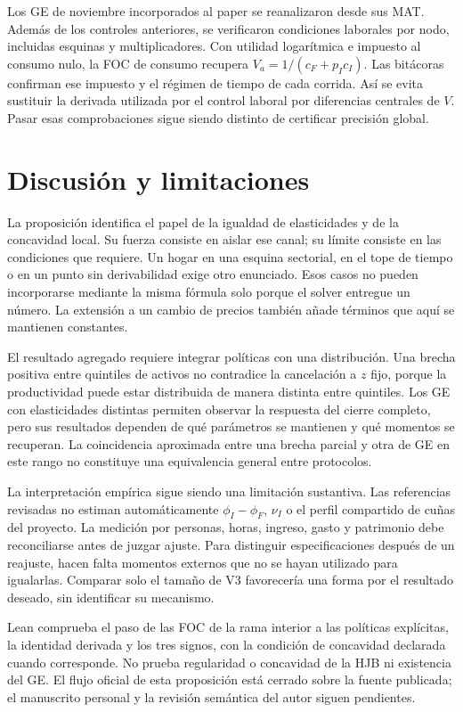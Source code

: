\documentclass[11pt]{article}
\theoremstyle{definition}
\newcommand{\Va}{V_a}
\begin{document}
Los \GEPaperCount{} GE de noviembre incorporados al paper se reanalizaron desde sus MAT. Además de los controles anteriores, se verificaron condiciones laborales por nodo, incluidas esquinas y multiplicadores. Con utilidad logarítmica e impuesto al consumo nulo, la FOC de consumo recupera \(\Va=1/(c_F+p_Ic_I)\). Las bitácoras confirman ese impuesto y el régimen de tiempo de cada corrida. Así se evita sustituir la derivada utilizada por el control laboral por diferencias centrales de \(V\). Pasar esas comprobaciones sigue siendo distinto de certificar precisión global.

\section{Discusión y limitaciones}
La proposición identifica el papel de la igualdad de elasticidades y de la concavidad local. Su fuerza consiste en aislar ese canal; su límite consiste en las condiciones que requiere. Un hogar en una esquina sectorial, en el tope de tiempo o en un punto sin derivabilidad exige otro enunciado. Esos casos no pueden incorporarse mediante la misma fórmula solo porque el solver entregue un número. La extensión a un cambio de precios también añade términos que aquí se mantienen constantes.

El resultado agregado requiere integrar políticas con una distribución. Una brecha positiva entre quintiles de activos no contradice la cancelación a \(z\) fijo, porque la productividad puede estar distribuida de manera distinta entre quintiles. Los GE con elasticidades distintas permiten observar la respuesta del cierre completo, pero sus resultados dependen de qué parámetros se mantienen y qué momentos se recuperan. La coincidencia aproximada entre una brecha parcial y otra de GE en este rango no constituye una equivalencia general entre protocolos.

La interpretación empírica sigue siendo una limitación sustantiva. Las referencias revisadas no estiman automáticamente \(\phi_I-\phi_F\), \(\nu_I\) o el perfil compartido de cuñas del proyecto. La medición por personas, horas, ingreso, gasto y patrimonio debe reconciliarse antes de juzgar ajuste. Para distinguir especificaciones después de un reajuste, hacen falta momentos externos que no se hayan utilizado para igualarlas. Comparar solo el tamaño de V3 favorecería una forma por el resultado deseado, sin identificar su mecanismo.

Lean comprueba el paso de las FOC de la rama interior a las políticas explícitas, la identidad derivada y los tres signos, con la condición de concavidad declarada cuando corresponde. No prueba regularidad o concavidad de la HJB ni existencia del GE. El flujo oficial de esta proposición está cerrado sobre la fuente publicada; el manuscrito personal y la revisión semántica del autor siguen pendientes.
\end{document}
